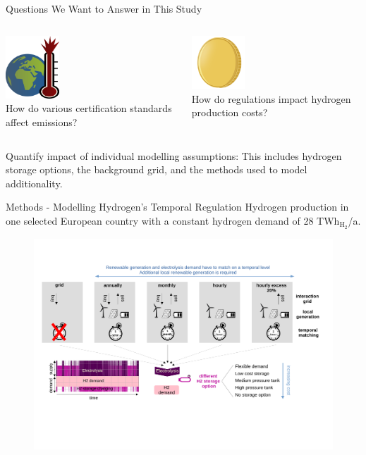 \begin{frame}{Questions We Want to Answer in This Study}
	\begin{columns}[t]
		\begin{column}{0.5\textwidth}
			\centering
			\includegraphics[width=2cm]{images/globalwarming.png} \\
			How do \alert{various certification} standards affect \alert{emissions}?\\
		\end{column}
		
		\begin{column}{0.5\textwidth}
			\centering
			\includegraphics[width=2cm]{images/coin.png} \\
			How do regulations impact \alert{hydrogen production costs}?
		\end{column}
	\end{columns}
	\vspace{0.5 cm}
	\begin{tcolorbox}[colback=gray!5,colframe=white!60!black,title=\textbf{Scientific Novelty}]
		\alert{Quantify impact of individual modelling assumptions:} This includes hydrogen storage options, the background grid, and the methods used to model additionality.
	\end{tcolorbox}
\end{frame}


\begin{frame}{Methods - Modelling Hydrogen's Temporal Regulation}
	Hydrogen production in one selected European country with a \alert{constant} hydrogen demand of 28 TWh$_{\text{H}_2}$/a. 
	\begin{figure}
		\centering
		\includegraphics[trim=0 0cm 0cm 3cm,clip=true, width=0.9\linewidth]{images/scenarios_new5_revised}
	\end{figure}
	
\end{frame}

